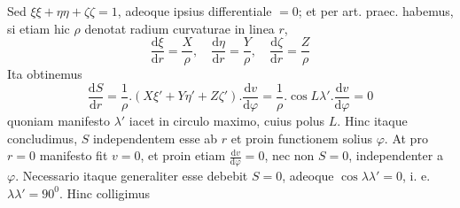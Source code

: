 Sed \(\xi\xi+\eta\eta+\zeta\zeta=1\), adeoque ipsius differentiale \(=0\); et per art. praec. habemus, si etiam hic \(\rho\) denotat radium curvaturae in linea \(r\),
\[
\frac{\mathrm{d}\xi}{\mathrm{d}r}=\frac{X}{\rho},\quad\frac{\mathrm{d}\eta}{\mathrm{d}r}=\frac{Y}{\rho},\quad\frac{\mathrm{d}\zeta}{\mathrm{d}r}=\frac{Z}{\rho}
\]
Ita obtinemus
\[
\frac{\mathrm{d}S}{\mathrm{d}r}=\frac{1}{\rho}\mathord{.}(X\xi'+Y\eta'+Z\zeta')\mathord{.}\frac{\mathrm{d}v}{\mathrm{d}\varphi}=\frac{1}{\rho}\mathord{.}\cos L\lambda'\mathord{.}\frac{\mathrm{d}v}{\mathrm{d}\varphi}=0
\]
quoniam manifesto \(\lambda'\) iacet in circulo maximo, cuius polus \(L\). Hinc itaque concludimus, \(S\) independentem esse ab \(r\) et proin functionem solius \(\varphi\). At pro \(r=0\) manifesto fit \(v=0\), et proin etiam \(\frac{\mathrm{d}v}{\mathrm{d}\varphi}=0\), nec non \(S=0\), independenter a \(\varphi\). Necessario itaque generaliter esse debebit \(S=0\), adeoque \(\cos\lambda\lambda'=0\), i. e. \(\lambda\lambda'=90^0\). Hinc colligimus
